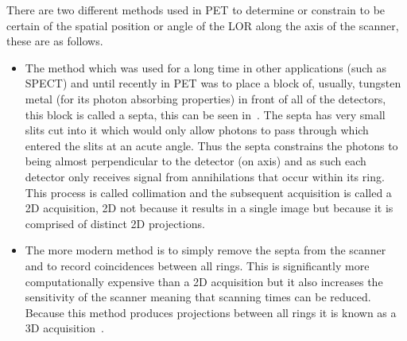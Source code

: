                 There are two different methods used in \gls{PET} to determine or constrain to be certain of the spatial position or angle of the \gls{LOR} along the axis of the scanner, these are as follows.
                
                \begin{itemize}
                    \item The method which was used for a long time in other applications (such as \gls{SPECT}) and until recently in \gls{PET} was to place a block of, usually, tungsten metal (for its photon absorbing properties) in front of all of the detectors, this block is called a septa, this can be seen in~. The septa has very small slits cut into it which would only allow photons to pass through which entered the slits at an acute angle. Thus the septa constrains the photons to being almost perpendicular to the detector (on axis) and as such each detector only receives signal from annihilations that occur within its ring. This process is called collimation and the subsequent acquisition is called a \gls{2D} acquisition, \gls{2D} not because it results in a single image but because it is comprised of distinct \gls{2D} projections.
                    
                    \item The more modern method is to simply remove the septa from the scanner and to record coincidences between all rings. This is significantly more computationally expensive than a \gls{2D} acquisition but it also increases the sensitivity of the scanner meaning that scanning times can be reduced. Because this method produces projections between all rings it is known as a \gls{3D} acquisition~\parencite{Schmitz2013, Bailey1998ExperienceTomographs}.
                \end{itemize}
            
